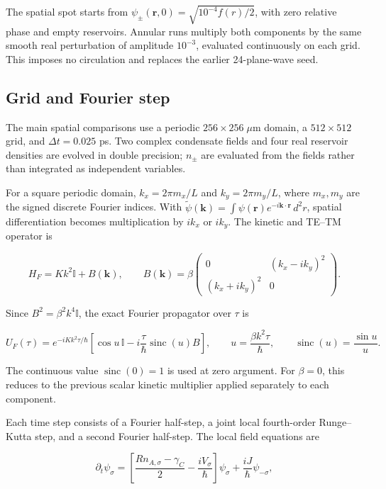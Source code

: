 \documentclass[12pt,a4paper]{article}
\begin{document}
The spatial spot starts from \(\psi_\pm(\mathbf r,0)=\sqrt{10^{-4}f(r)/2}\), with zero relative phase and empty reservoirs. Annular runs multiply both components by the same smooth real perturbation of amplitude \(10^{-3}\), evaluated continuously on each grid. This imposes no circulation and replaces the earlier 24-plane-wave seed.

\subsection{Grid and Fourier step}

The main spatial comparisons use a periodic \(256\times256\;\mu\mathrm m\) domain, a \(512\times512\) grid, and \(\Delta t=0.025\) ps. Two complex condensate fields and four real reservoir densities are evolved in double precision; \(n_\pm\) are evaluated from the fields rather than integrated as independent variables.

For a square periodic domain, \(k_x=2\pi m_x/L\) and \(k_y=2\pi m_y/L\), where \(m_x,m_y\) are the signed discrete Fourier indices. With \(\widetilde\psi(\mathbf k)=\int\psi(\mathbf r)e^{-i\mathbf k\cdot\mathbf r}\,d^2r\), spatial differentiation becomes multiplication by \(ik_x\) or \(ik_y\). The kinetic and TE--TM operator is

\[
H_F=Kk^2\mathbb I+B(\mathbf k),\qquad
B(\mathbf k)=\beta\begin{pmatrix}
0&(k_x-ik_y)^2\\
(k_x+ik_y)^2&0
\end{pmatrix}.
\tag{24}\label{eq:24}
\]

Since \(B^2=\beta^2 k^4\mathbb I\), the exact Fourier propagator over \(\tau\) is

\[
U_F(\tau)=e^{-iKk^2\tau/\hbar}
\left[\cos u\,\mathbb I-i\frac{\tau}{\hbar}\operatorname{sinc}(u)B\right],
\qquad u=\frac{\beta k^2\tau}{\hbar},\qquad
\operatorname{sinc}(u)=\frac{\sin u}{u}.
\tag{25}\label{eq:25}
\]

The continuous value \(\operatorname{sinc}(0)=1\) is used at zero argument. For \(\beta=0\), this reduces to the previous scalar kinetic multiplier applied separately to each component.

Each time step consists of a Fourier half-step, a joint local fourth-order Runge--Kutta step, and a second Fourier half-step. The local field equations are

\[
\partial_t\psi_\sigma=
\left[\frac{Rn_{A,\sigma}-\gamma_C}{2}-\frac{iV_\sigma}{\hbar}\right]\psi_\sigma
+\frac{iJ}{\hbar}\psi_{-\sigma},
\tag{26}\label{eq:26}
\]
\end{document}
